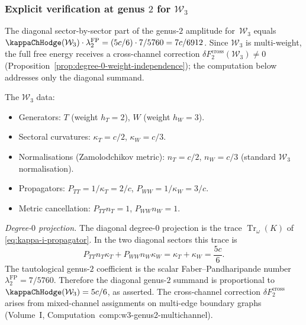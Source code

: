 \subsubsection{Explicit verification at genus $2$ for
$\mathcal{W}_3$}

\begin{computation}
\label{comp:genus-2-w3}

The diagonal sector-by-sector part of the
genus-$2$ amplitude for~$\mathcal{W}_3$ equals
$\kappaChHodge(\mathcal{W}_3) \cdot
\lambda_2^{\mathrm{FP}} = (5c/6) \cdot 7/5760 = 7c/6912$.
Since $\mathcal{W}_3$ is multi-weight, the full free energy
receives a cross-channel correction
$\delta F_2^{\mathrm{cross}}(\mathcal{W}_3) \neq 0$
\textup{(}Proposition~\ref{prop:degree-0-weight-independence}\textup{)};
the computation below addresses only the diagonal summand.

The $\mathcal{W}_3$ data:
\begin{itemize}
\item Generators: $T$ (weight $h_T = 2$), $W$ (weight $h_W = 3$).
\item Sectoral curvatures: $\kappa_T = c/2$, $\kappa_W = c/3$.
\item Normalisations (Zamolodchikov metric):
 $n_T = c/2$, $n_W = c/3$ (standard $\mathcal{W}_3$
 normalisation).
\item Propagators: $P_{TT} = 1/\kappa_T = 2/c$,
 $P_{WW} = 1/\kappa_W = 3/c$.
\item Metric cancellation:
 $P_{TT}n_T = 1$, $P_{WW}n_W = 1$.
\end{itemize}

\emph{Degree-$0$ projection.} The diagonal degree-$0$ projection is
the trace \(\operatorname{Tr}_{\omega}(K)\) of
\eqref{eq:kappa-i-propagator}. In the two diagonal sectors this trace
is
\[
P_{TT}n_T\kappa_T+P_{WW}n_W\kappa_W
=\kappa_T+\kappa_W=\frac{5c}{6}.
\]
The tautological genus-$2$ coefficient is the scalar
Faber--Pandharipande number \(\lambda_2^{\mathrm{FP}}=7/5760\).
Therefore the diagonal genus-$2$ summand is proportional to
\(\kappaChHodge(\cW_3)=5c/6\), as asserted.
The cross-channel correction $\delta F_2^{\mathrm{cross}}$
arises from mixed-channel assignments on multi-edge boundary
graphs \textup{(}Volume~I,
Computation~\textup{comp:w3-genus2-multichannel)}.


\end{computation}
